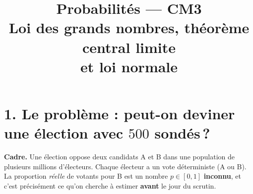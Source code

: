
\usepackage{tikz}

\newcommand{\atrou}[2][3cm]{%
  \ifthenelse{\boolean{showSolutions}}{%
    \par\vspace{0.5em}%
    \begin{mdframed}[backgroundcolor=ThemeLight, linewidth=0pt,
      skipabove=0pt, skipbelow=0pt,
      innertopmargin=8pt, innerbottommargin=8pt]%
    #2%
    \end{mdframed}%
    \par\vspace{0.5em}%
  }{%
    \par\vspace{0.5em}%
    \noindent\fbox{\begin{minipage}[c][#1]%
      {\dimexpr\textwidth-2\fboxsep-2\fboxrule\relax}%
      \color{white}\rule{0pt}{0pt}%
    \end{minipage}}%
    \par\vspace{0.5em}%
  }%
}

\newcommand{\val}[1]{%
  \ifthenelse{\boolean{showSolutions}}{#1}{\phantom{#1}}%
}

\newcommand{\R}{\mathbb{R}}
\newcommand{\E}{\mathbb{E}}
\newcommand{\Var}{\operatorname{Var}}
\newcommand{\Xbar}{\overline{X}_n}

\title{\sffamily\bfseries Probabilités --- CM3\\[0.3em]
  \Large Loi des grands nombres, théorème central limite\\
  et loi normale}
\author{}
\date{}


\sffamily
\maketitle
\thispagestyle{empty}

\section*{1. Le problème : peut-on deviner une élection avec $500$ sondés\,?}

\textbf{Cadre.} Une élection oppose deux candidats A et B dans une
population de plusieurs millions d'électeurs. Chaque électeur a un
vote déterministe (A ou B). La proportion \emph{réelle} de votants
pour B est un nombre $p\in[0,1]$ \textbf{inconnu}, et c'est
précisément ce qu'on cherche à estimer \textbf{avant} le jour du
scrutin.

